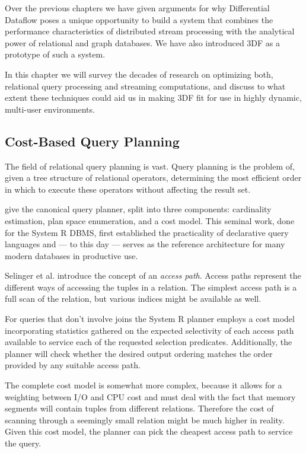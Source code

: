 \documentclass[../index.tex]{subfiles}
\begin{document}
Over the previous chapters we have given arguments for why
Differential Dataflow poses a unique opportunity to build a system
that combines the performance characteristics of distributed stream
processing with the analytical power of relational and graph
databases. We have also introduced 3DF as a prototype of such a
system.

In this chapter we will survey the decades of research on optimizing
both, relational query processing and streaming computations, and
discuss to what extent these techniques could aid us in making 3DF fit
for use in highly dynamic, multi-user environments.

\subsection{Cost-Based Query Planning}

The field of relational query planning is vast. Query planning is the
problem of, given a tree structure of relational operators,
determining the most efficient order in which to execute these
operators without affecting the result set.

\cite{selinger1979access} give the canonical query planner, split into
three components: cardinality estimation, plan space enumeration, and
a cost model. This seminal work, done for the System R DBMS, first
established the practicality of declarative query languages and — to
this day — serves as the reference architecture for many modern
databases in productive use.

Selinger et al. introduce the concept of an \emph{access path}. Access
paths represent the different ways of accessing the tuples in a
relation. The simplest access path is a full scan of the relation, but
various indices might be available as well.

For queries that don't involve joins the System R planner employs a
cost model incorporating statistics gathered on the expected
selectivity of each access path available to service each of the
requested selection predicates. Additionally, the planner will check
whether the desired output ordering matches the order provided by any
suitable access path.

The complete cost model is somewhat more complex, because it allows
for a weighting between I/O and CPU cost and must deal with the fact
that memory segments will contain tuples from different
relations. Therefore the cost of scanning through a seemingly small
relation might be much higher in reality. Given this cost model, the
planner can pick the cheapest access path to service the query.
\end{document}
